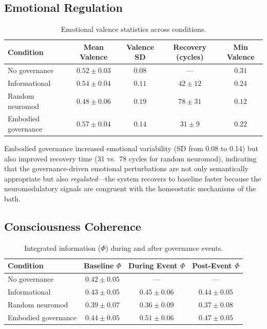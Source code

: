 \documentclass[11pt,a4paper]{article}
\begin{document}
\subsection{Emotional Regulation}

\begin{table}[h]
\centering
\caption{Emotional valence statistics across conditions.}
\label{tab:emotion}
\begin{tabular}{lcccc}
\toprule
\textbf{Condition} & \textbf{Mean Valence} & \textbf{Valence SD} & \textbf{Recovery (cycles)} & \textbf{Min Valence} \\
\midrule
No governance       & $0.52 \pm 0.03$ & $0.08$ & --- & $0.31$ \\
Informational       & $0.54 \pm 0.04$ & $0.11$ & $42 \pm 12$ & $0.24$ \\
Random neuromod     & $0.48 \pm 0.06$ & $0.19$ & $78 \pm 31$ & $0.12$ \\
Embodied governance & $0.57 \pm 0.04$ & $0.14$ & $31 \pm 9$ & $0.22$ \\
\bottomrule
\end{tabular}
\end{table}

Embodied governance increased emotional variability (SD from 0.08 to 0.14) but also improved recovery time (31 vs.\ 78 cycles for random neuromod), indicating that the governance-driven emotional perturbations are not only semantically appropriate but also \emph{regulated}---the system recovers to baseline faster because the neuromodulatory signals are congruent with the homeostatic mechanisms of the bath.

\subsection{Consciousness Coherence}

\begin{table}[h]
\centering
\caption{Integrated information ($\Phi$) during and after governance events.}
\label{tab:phi}
\begin{tabular}{lccc}
\toprule
\textbf{Condition} & \textbf{Baseline $\Phi$} & \textbf{During Event $\Phi$} & \textbf{Post-Event $\Phi$} \\
\midrule
No governance       & $0.42 \pm 0.05$ & --- & --- \\
Informational       & $0.43 \pm 0.05$ & $0.45 \pm 0.06$ & $0.44 \pm 0.05$ \\
Random neuromod     & $0.39 \pm 0.07$ & $0.36 \pm 0.09$ & $0.37 \pm 0.08$ \\
Embodied governance & $0.44 \pm 0.05$ & $0.51 \pm 0.06$ & $0.47 \pm 0.05$ \\
\bottomrule
\end{tabular}
\end{table}
\end{document}
